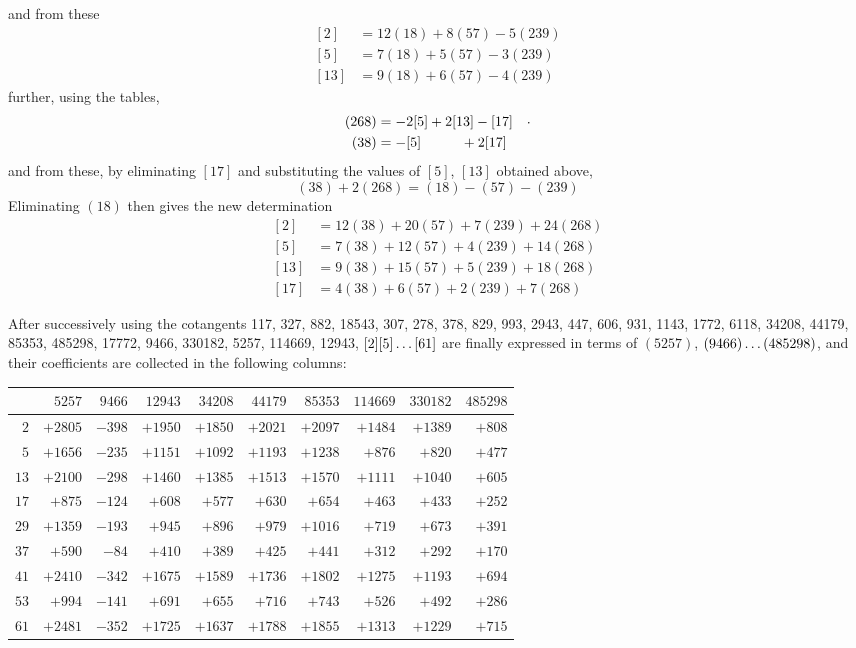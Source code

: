 and from these
\[
\begin{aligned}
{}[2]&=12(18)+8(57)-5(239)\\
{}[5]&=7(18)+5(57)-3(239)\\
{}[13]&=9(18)+6(57)-4(239)
\end{aligned}
\]
further, using the tables,
\[
\begin{aligned}
(268)&=-2[5]+2[13]-[17]\quad\raisebox{.4ex}{$\pdot$}\\
(38)&=-[5]\phantom{+2[13]}+2[17]
\end{aligned}
\]
and from these, by eliminating $[17]$ and substituting the values of $[5]$, $[13]$ obtained above,
\[
(38)+2(268)=(18)-(57)-(239)
\]
Eliminating $(18)$ then gives the new determination
\[
\begin{aligned}
{}[2]&=12(38)+20(57)+7(239)+24(268)\\
{}[5]&=7(38)+12(57)+4(239)+14(268)\\
{}[13]&=9(38)+15(57)+5(239)+18(268)\\
{}[17]&=4(38)+6(57)+2(239)+7(268)
\end{aligned}
\]
\par After successively using the cotangents 117, 327, 882, 18543, 307, 278, 378, 829, 993, 2943, 447, 606, 931, 1143, 1772, 6118, 34208, 44179, 85353, 485298, 17772, 9466, 330182, 5257, 114669, 12943, $[2][5]\mathinner{.\,.\,.}[61]$ are finally expressed in terms of $(5257)$, $(9466)\mathinner{.\,.\,.}(485298)$, and their coefficients are collected in the following columns:
\begingroup\fontsize{9.5}{12}\selectfont\setlength{\tabcolsep}{2.3pt}
\begin{center}
\begin{tabular}{r|r|r|r|r|r|r|r|r|r}
 & $5257$ & $9466$ & $12943$ & $34208$ & $44179$ & $85353$ & $114669$ & $330182$ & $485298$ \\\hline
$2$ & $+2805$ & $-398$ & $+1950$ & $+1850$ & $+2021$ & $+2097$ & $+1484$ & $+1389$ & $+808$ \\
$5$ & $+1656$ & $-235$ & $+1151$ & $+1092$ & $+1193$ & $+1238$ & $+876$ & $+820$ & $+477$ \\
$13$ & $+2100$ & $-298$ & $+1460$ & $+1385$ & $+1513$ & $+1570$ & $+1111$ & $+1040$ & $+605$ \\
$17$ & $+875$ & $-124$ & $+608$ & $+577$ & $+630$ & $+654$ & $+463$ & $+433$ & $+252$ \\
$29$ & $+1359$ & $-193$ & $+945$ & $+896$ & $+979$ & $+1016$ & $+719$ & $+673$ & $+391$ \\
$37$ & $+590$ & $-84$ & $+410$ & $+389$ & $+425$ & $+441$ & $+312$ & $+292$ & $+170$ \\
$41$ & $+2410$ & $-342$ & $+1675$ & $+1589$ & $+1736$ & $+1802$ & $+1275$ & $+1193$ & $+694$ \\
$53$ & $+994$ & $-141$ & $+691$ & $+655$ & $+716$ & $+743$ & $+526$ & $+492$ & $+286$ \\
$61$ & $+2481$ & $-352$ & $+1725$ & $+1637$ & $+1788$ & $+1855$ & $+1313$ & $+1229$ & $+715$ \\
\end{tabular}
\end{center}\endgroup
